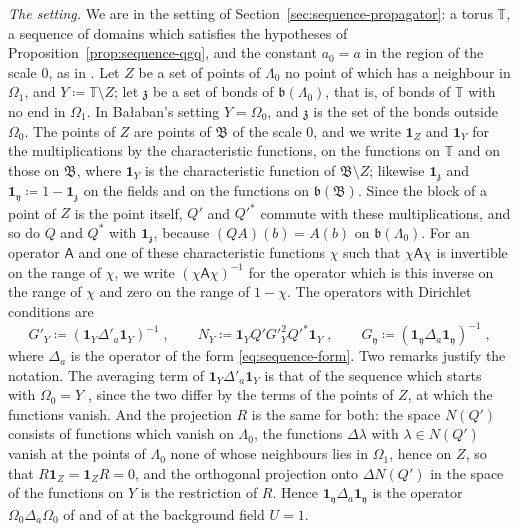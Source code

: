 \documentclass[11pt]{preprint}
\numberwithin{equation}{section}
\theoremstyle{definition}
\theoremstyle{remark}
\theoremstyle{plain}
\begin{document}
\emph{The setting.} We are in the setting of Section~\ref{sec:sequence-propagator}: a torus $\mathbb T$, a sequence of domains which satisfies the hypotheses of Proposition~\ref{prop:sequence-qgq}, and the constant $a_0 = a$ in the region of the scale $0$, as in \cite[(3.24)]{BalabanPBG}. Let $Z$ be a set of points of $\Lambda_0$ no point of which has a neighbour in $\Omega_1$, and $Y \coloneqq \mathbb T \setminus Z$; let $\mathfrak z$ be a set of bonds of $\mathfrak b(\Lambda_0)$, that is, of bonds of $\mathbb T$ with no end in $\Omega_1$. In Ba{\l}aban's setting $Y = \Omega_0$, and $\mathfrak z$ is the set of the bonds outside $\Omega_0$. The points of $Z$ are points of $\mathfrak B$ of the scale $0$, and we write $\mathbf 1_Z$ and $\mathbf 1_Y$ for the multiplications by the characteristic functions, on the functions on $\mathbb T$ and on those on $\mathfrak B$, where $\mathbf 1_Y$ is the characteristic function of $\mathfrak B \setminus Z$; likewise $\mathbf 1_{\mathfrak z}$ and $\mathbf 1_{\mathfrak y} \coloneqq 1 - \mathbf 1_{\mathfrak z}$ on the fields and on the functions on $\mathfrak b(\mathfrak B)$. Since the block of a point of $Z$ is the point itself, $Q'$ and $Q'^*$ commute with these multiplications, and so do $Q$ and $Q^*$ with $\mathbf 1_{\mathfrak z}$, because $(QA)(b) = A(b)$ on $\mathfrak b(\Lambda_0)$. For an operator $\mathsf A$ and one of these characteristic functions $\chi$ such that $\chi\mathsf A\chi$ is invertible on the range of $\chi$, we write $(\chi\mathsf A\chi)^{-1}$ for the operator which is this inverse on the range of $\chi$ and zero on the range of $1 - \chi$. The operators with Dirichlet conditions are
\begin{equation}\label{eq:dirichlet-operators}
    G'_Y \coloneqq (\mathbf 1_Y\Delta'_a\mathbf 1_Y)^{-1}\;,
    \qquad
    N_Y \coloneqq \mathbf 1_YQ'G'^2_YQ'^*\mathbf 1_Y\;,
    \qquad
    G_{\mathfrak y} \coloneqq (\mathbf 1_{\mathfrak y}\Delta_a\mathbf 1_{\mathfrak y})^{-1}\;,
\end{equation}
where $\Delta_a$ is the operator of the form \eqref{eq:sequence-form}. Two remarks justify the notation. The averaging term of $\mathbf 1_Y\Delta'_a\mathbf 1_Y$ is that of the sequence which starts with $\Omega_0 = Y$ \cite[(3.24)]{BalabanPBG}, since the two differ by the terms of the points of $Z$, at which the functions vanish. And the projection $R$ is the same for both: the space $N(Q')$ consists of functions which vanish on $\Lambda_0$, the functions $\Delta\lambda$ with $\lambda \in N(Q')$ vanish at the points of $\Lambda_0$ none of whose neighbours lies in $\Omega_1$, hence on $Z$, so that $R\mathbf 1_Z = \mathbf 1_ZR = 0$, and the orthogonal projection onto $\Delta N(Q')$ in the space of the functions on $Y$ is the restriction of $R$. Hence $\mathbf 1_{\mathfrak y}\Delta_a\mathbf 1_{\mathfrak y}$ is the operator $\Omega_0\Delta_a\Omega_0$ of \cite[p.~228]{BalabanPRT2} and of \cite[(3.26), (3.27)]{BalabanPBG} at the background field $U = 1$.
\end{document}
